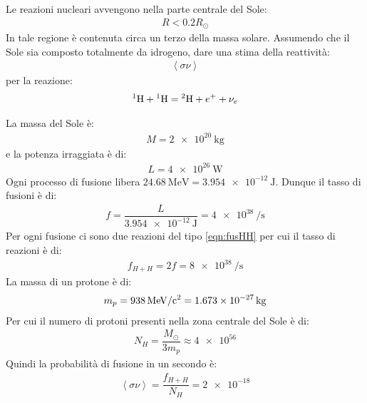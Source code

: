 \documentclass[../main.tex]{subfiles}
\begin{document}
	\begin{ese}[10.2]
		Le reazioni nucleari avvengono nella parte centrale del Sole:
		\begin{gather}
			R<0.2R_{\odot}
		\end{gather}
		In tale regione è contenuta circa un terzo della massa solare. Assumendo che il Sole sia composto totalmente da idrogeno, dare una stima della reattività:
		\begin{gather*}
			\left<\sigma\nu\right> 
		\end{gather*}
		per la reazione:
		\begin{gather}
		\label{eqn:fusHH}
			\mathrm{^{1}H}+\mathrm{^{1}H}=\mathrm{^{2}H}+e^{+}+\nu_{e}
		\end{gather}
	\end{ese}
	\begin{svol}
		La massa del Sole è:
		\begin{gather*}
		M=\SI{2e20}{\kilo\gram}
		\end{gather*}
		e la potenza irraggiata è di:
		\begin{gather*}
		L=\SI{4e26}{\watt}
		\end{gather*}
		Ogni processo di fusione libera $ \SI{24.68}{\mega\electronvolt}=	\SI{3.954e-12}{\joule} $. Dunque il tasso di fusioni è di:
		\begin{gather*}
		f=\dfrac{L}{\SI{3.954e-12}{\joule}}=\SI{4e38}{\per\second}
		\end{gather*}
		Per ogni fusione ci sono due reazioni del tipo \ref{eqn:fusHH} per cui il tasso di reazioni è di:
		\begin{gather}
		f_{H+H}=2f=\SI{8e38}{\per\second}
		\end{gather}
		La massa di un protone è di:
		\begin{gather*}
			m_{p}=\SI{938}{\mega\electronvolt\per c\squared}=\SI{1.673e-27}{\kilo\gram}
		\end{gather*}
		Per cui il numero di protoni presenti nella zona centrale del Sole è di:
		\begin{gather*}
		N_{H}=\dfrac{M_{\odot}}{3m_{p}}\approx \num{4e56}
		\end{gather*}
		Quindi la probabilità di fusione in un secondo è:
		\begin{gather*}
			\left<\sigma\nu\right>=\dfrac{f_{H+H}}{N_{H}}=\num{2e-18}
		\end{gather*}
	\end{svol}
\end{document}
